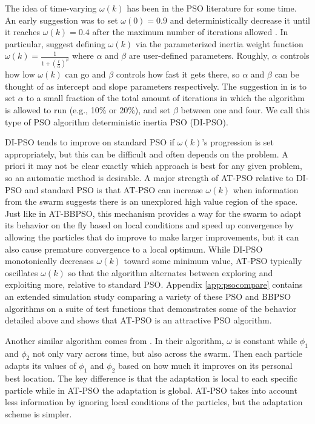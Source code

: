 \documentclass[cmbright]{staauth}
\begin{document}
The idea of time-varying $\omega(k)$ has been in the PSO literature for some time. An early suggestion was to set $\omega(0)=0.9$ and deterministically decrease it until it reaches $\omega(k)=0.4$ after the maximum number of iterations allowed \citep{eberhart2000comparing}. In particular, \citet{tuppadung2011comparing} suggest defining $\omega(k)$ via the parameterized inertia weight function $\omega(k) = \frac{1}{1 + \left(\frac{t}{\alpha}\right)^{\beta}}$ where $\alpha$ and $\beta$ are user-defined parameters. Roughly, $\alpha$ controls how low $\omega(k)$ can go and $\beta$ controls how fast it gets there, so $\alpha$ and $\beta$ can be thought of as intercept and slope parameters respectively. The suggestion in \citet{tuppadung2011comparing} is to set $\alpha$ to a small fraction of the total amount of iterations in which the algorithm is allowed to run (e.g., 10\% or 20\%), and set $\beta$ between one and four. We call this type of PSO algorithm deterministic inertia PSO (DI-PSO).

DI-PSO tends to improve on standard PSO if $\omega(k)$'s progression is set appropriately, but this can be difficult and often depends on the problem. A priori it may not be clear exactly which approach is best for any given problem, so an automatic method is desirable. A major strength of AT-PSO relative to DI-PSO and standard PSO is that AT-PSO can increase $\omega(k)$ when information from the swarm suggests there is an unexplored high value region of the space. Just like in AT-BBPSO, this mechanism provides a way for the swarm to adapt its behavior on the fly based on local conditions and speed up convergence by allowing the particles that do improve to make larger improvements, but it can also cause premature convergence to a local optimum. While DI-PSO monotonically decreases $\omega(k)$ toward some minimum value, AT-PSO typically oscillates $\omega(k)$ so that the algorithm alternates between exploring and exploiting more, relative to standard PSO. Appendix \ref{app:psocompare} contains an extended simulation study comparing a variety of these PSO and BBPSO algorithms on a suite of test functions that demonstrates some of the behavior detailed above and shows that AT-PSO is an attractive PSO algorithm.

Another similar algorithm comes from \citet{zhang2003adaptive}. In their algorithm, $\omega$ is constant while $\phi_1$ and $\phi_2$ not only vary across time, but also across the swarm. Then each particle adapts its values of $\phi_1$ and $\phi_2$ based on how much it improves on its personal best location. The key difference is that the adaptation is local to each specific particle while in AT-PSO the adaptation is global. AT-PSO takes into account less information by ignoring local conditions of the particles, but the adaptation scheme is simpler.
\end{document}
